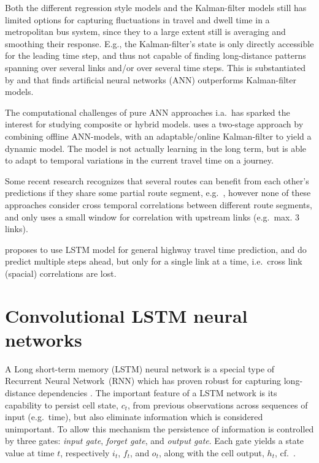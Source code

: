 \documentclass[preprint,12pt]{elsarticle}
\begin{document}
Both the different regression style models and the Kalman-filter models still has limited options for capturing fluctuations in travel and dwell time in a metropolitan bus system, since they to a large extent still is averaging and smoothing their response. E.g., the Kalman-filter's state is only directly accessible for the leading time step, and thus not capable of finding long-distance patterns spanning over several links and/or over several time steps. This is substantiated by \cite{Lin2013} and \cite{Kumar2014} that finds artificial neural networks (ANN) outperforms Kalman-filter models.

The computational challenges of pure ANN approaches i.a.\ has sparked the interest for studying composite or hybrid models. \cite{Zaki2013} uses a two-stage approach by combining offline ANN-models, with an adaptable/online Kalman-filter to yield a dynamic model. The model is not actually learning in the long term, but is able to adapt to temporal variations in the current travel time on a journey.

Some recent research recognizes that several routes can benefit from each other's predictions if they share some partial route segment, e.g.\ \cite{Yu2011,Gal2014,Bai2015}, however none of these approaches consider cross temporal correlations between different route segments, and only uses a small window for correlation with upstream links (e.g.\ max. 3 links).

\cite{YanjieDuan2016} proposes to use LSTM model for general highway travel time prediction, and do predict multiple steps ahead, but only for a single link at a time, i.e.\ cross link (spacial) correlations are lost.

\section{Convolutional LSTM neural networks}
\label{sec:convlstm}
A Long short-term memory (LSTM) neural network is a special type of Recurrent Neural Network~(RNN) which has proven robust for capturing long-distance dependencies \cite{Lstm1,Lstm2}. The important feature of a LSTM network is its capability to persist cell state, $c_t$, from previous observations across sequences of input (e.g.\ time), but also eliminate information which is considered unimportant. To allow this mechanism the persistence of information is controlled by three gates: \emph{input gate}, \emph{forget gate}, and \emph{output gate}. Each gate yields a state value at time $t$, respectively $i_t$, $f_t$, and $o_t$, along with the cell output, $h_t$, cf.\ .
\end{document}
